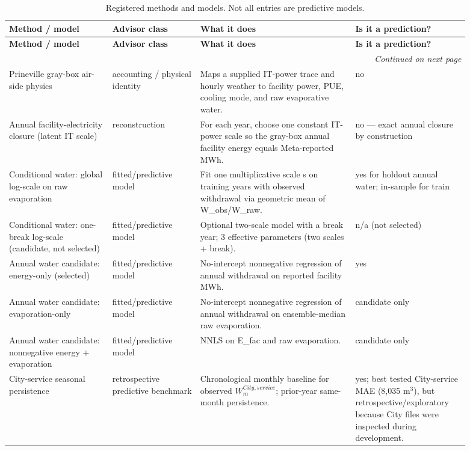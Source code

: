 \documentclass[11pt]{article}
\newcommand{\latesttxt}[1]{\textcolor{purple!85!black}{#1}}
\begin{document}
\begingroup
\footnotesize
\setlength{\tabcolsep}{3.5pt}
\begin{longtable}{@{}p{0.20\linewidth}p{0.17\linewidth}p{0.30\linewidth}p{0.22\linewidth}@{}}
\caption{Registered methods and models. Not all entries are predictive models.}\\
\toprule
\textbf{Method / model} & \textbf{Advisor class} & \textbf{What it does} & \textbf{Is it a prediction?} \\
\midrule
\endfirsthead
\toprule
\textbf{Method / model} & \textbf{Advisor class} & \textbf{What it does} & \textbf{Is it a prediction?} \\
\midrule
\endhead
\midrule
\multicolumn{4}{r}{\emph{Continued on next page}}\\
\endfoot
\bottomrule
\endlastfoot
Prineville gray-box air-side physics & accounting / physical identity & Maps a supplied IT-power trace and hourly weather to facility power, PUE, cooling mode, and raw evaporative water. & no\\
Annual facility-electricity closure (latent IT scale) & reconstruction & For each year, choose one constant IT-power scale so the gray-box annual facility energy equals Meta-reported MWh. & no --- exact annual closure by construction\\
Conditional water: global log-scale on raw evaporation & fitted/predictive model & Fit one multiplicative scale s on training years with observed withdrawal via geometric mean of W\_obs/W\_raw. & yes for holdout annual water; in-sample for train\\
Conditional water: one-break log-scale (candidate, not selected) & fitted/predictive model & Optional two-scale model with a break year; 3 effective parameters (two scales + break). & n/a (not selected)\\
Annual water candidate: energy-only (selected) & fitted/predictive model & No-intercept nonnegative regression of annual withdrawal on reported facility MWh. & yes\\
Annual water candidate: evaporation-only & fitted/predictive model & No-intercept nonnegative regression of annual withdrawal on ensemble-median raw evaporation. & candidate only\\
Annual water candidate: nonnegative energy + evaporation & fitted/predictive model & NNLS on E\_fac and raw evaporation. & candidate only\\
\latesttxt{City-service seasonal persistence} & \latesttxt{retrospective predictive benchmark} & \latesttxt{Chronological monthly baseline for observed \(W^{City,service}_m\); prior-year same-month persistence.} & \latesttxt{yes; best tested City-service MAE (8,035 m$^3$), but retrospective/exploratory because City files were inspected during development.}\\

\end{longtable}
\end{document}
